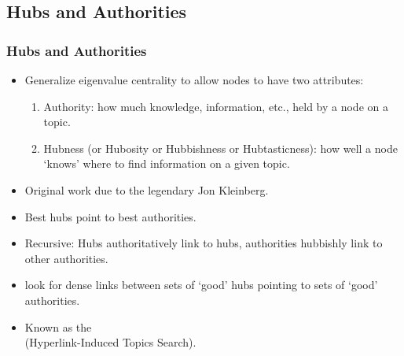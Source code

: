 \subsection{Hubs and Authorities}

\begin{frame}
  \frametitle{Hubs and Authorities}

  \begin{itemize}
  \item<1-> Generalize eigenvalue centrality to 
    allow nodes to have two attributes:
    \begin{enumerate}
    \item<2-> 
      \alert{Authority:} 
      how much knowledge, information, etc.,
      held by a node on a topic.
    \item<3-> 
      \alert{Hubness (or Hubosity or Hubbishness or Hubtasticness):}
      how well a node `knows' where to find
      information on a given topic.
    \end{enumerate}
  \item<4-> Original work due to 
    the legendary Jon Kleinberg.\cite{kleinberg1998a}
  \item<5->
    Best hubs point to best authorities.
  \item<6->
    \alert{Recursive:} 
    Hubs authoritatively link to hubs, 
    authorities hubbishly link to other authorities.
  \item<7->
     look for dense links
    between sets of `good' hubs pointing to sets of 
    `good' authorities.
  \item<8->
    Known as the
    \\
    (Hyperlink-Induced Topics Search).
  \end{itemize}

\end{frame}

